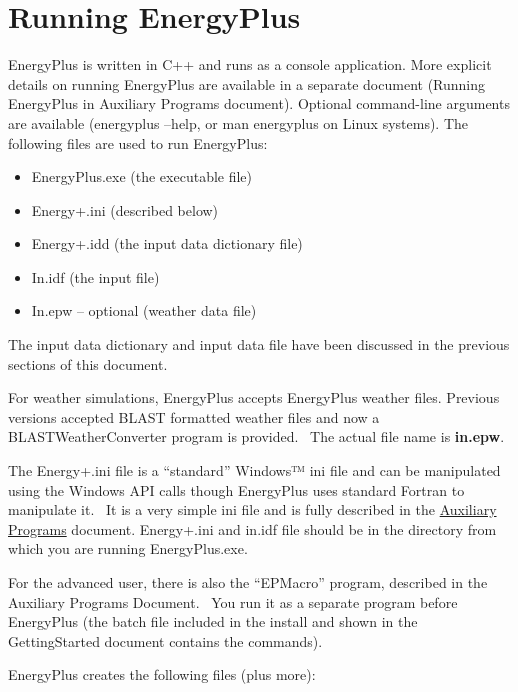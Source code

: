 \chapter{Running EnergyPlus}\label{running-energyplus}

EnergyPlus is written in C++ and runs as a console application. More explicit details on running EnergyPlus are available in a separate document (Running EnergyPlus in Auxiliary Programs document). Optional command-line arguments are available (energyplus --help, or man energyplus on Linux systems). The following files are used to run EnergyPlus:

\begin{itemize}
\item
  EnergyPlus.exe (the executable file)
\item
  Energy+.ini (described below)
\item
  Energy+.idd (the input data dictionary file)
\item
  In.idf (the input file)
\item
  In.epw -- optional (weather data file)
\end{itemize}

The input data dictionary and input data file have been discussed in the previous sections of this document.

For weather simulations, EnergyPlus accepts EnergyPlus weather files. Previous versions accepted BLAST formatted weather files and now a BLASTWeatherConverter program is provided.~ The actual file name is \textbf{in.epw}.

The Energy+.ini file is a ``standard'' Windows™ ini file and can be manipulated using the Windows API calls though EnergyPlus uses standard Fortran to manipulate it.~ It is a very simple ini file and is fully described in the \href{file:///E:/Docs4PDFs/AuxiliaryPrograms.pdf}{Auxiliary Programs} document. Energy+.ini and in.idf file should be in the directory from which you are running EnergyPlus.exe.

For the advanced user, there is also the ``EPMacro'' program, described in the Auxiliary Programs Document.~ You run it as a separate program before EnergyPlus (the batch file included in the install and shown in the GettingStarted document contains the commands).

EnergyPlus creates the following files (plus more):

